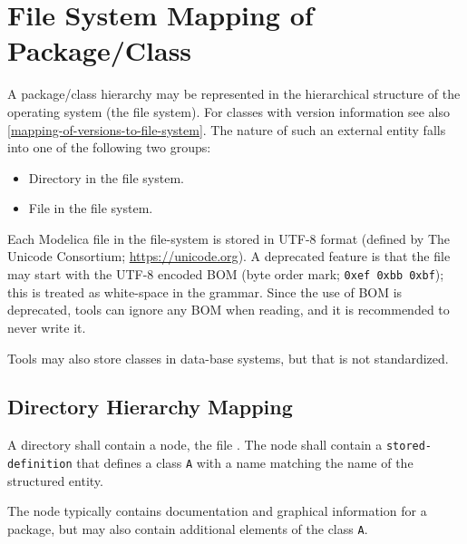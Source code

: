 \section{File System Mapping of Package/Class}\label{mapping-package-class-structures-to-a-hierarchical-file-system}\label{file-system-mapping-of-package-class}

A package/class hierarchy may be represented in the hierarchical structure of the operating system (the file system).
For classes with version information see also \cref{mapping-of-versions-to-file-system}.
The nature of such an external entity falls into one of the following two groups:
\begin{itemize}
\item
  Directory in the file system.
\end{itemize}

\begin{itemize}
\item
  File in the file system.
\end{itemize}

Each Modelica file in the file-system is stored in UTF-8 format (defined by The Unicode Consortium; \url{https://unicode.org}).
A deprecated feature is that the file may start with the UTF-8 encoded BOM (byte order mark; \lstinline!0xef 0xbb 0xbf!); this is treated as white-space in the grammar.
Since the use of BOM is deprecated, tools can ignore any BOM when reading, and it is recommended to never write it.

\begin{nonnormative}
Tools may also store classes in data-base systems, but that is not standardized.
\end{nonnormative}


\subsection{Directory Hierarchy Mapping}\label{mapping-a-package-class-hierarchy-into-a-directory-hierarchy-structured-entity}\label{directory-hierarchy-mapping}

A directory shall contain a node, the file .
The node shall contain a \lstinline[language=grammar]!stored-definition! that defines a class \lstinline!A! with a name matching the name of the structured entity.

\begin{nonnormative}
The node typically contains documentation and graphical information for a package, but may also contain additional elements of the class \lstinline!A!.
\end{nonnormative}

